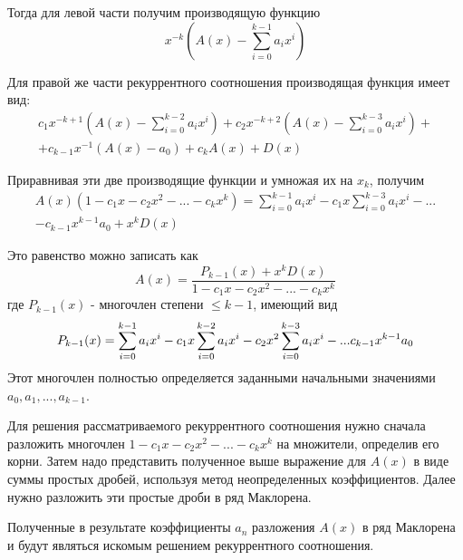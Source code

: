 Тогда для левой части получим производящую функцию 
\begin{equation*}
    x^{-k}\left(A(x) - \sum_{i = 0}^{k-1} a_i x^i\right)
\end{equation*}

Для правой же части рекуррентного соотношения производящая функция имеет вид:
\begin{multline*}
    c_1 x^{-k+1}\left(A(x) - \sum_{i = 0}^{k-2} a_i x^i\right) + c_2 x^{-k+2}\left(A(x) - \sum_{i = 0}^{k-3} a_i x^i \right) + \\
    + c_{k-1}x^{-1}(A(x) - a_0) + c_k A(x) + D(x)
\end{multline*}

Приравнивая эти две производящие функции и умножая их на $x_k$, получим
\begin{eqnarray*}
    A(x)(1 - c_1x - c_2 x^2 - ... - c_k x^k) = \sum_{i = 0}^{k-1} a_i x^i - c_1 x \sum_{i = 0}^{k-3} a_i x^i - ... \\
    - c_{k-1}x^{k-1}a_0 + x^k D(x)
\end{eqnarray*}

Это равенство можно записать как
\begin{equation}
    \label{gen_func_rec}
    A(x) = \frac{P_{k-1}(x) + x^k D(x)}{1 - c_1 x - c_2 x^2 - ... - c_k x^k}
\end{equation}
где $P_{k-1}(x)$ - многочлен степени $\leq k - 1$, имеющий вид 
\begin{equation}
    \label{p_k}
    P_{k-1}(x) = \sum_{i = 0}^{k - 1}a_i x^i - c_1 x \sum_{i = 0}^{k-2}a_i x^i - c_2 x^2\sum_{i = 0}^{k-3} a_i x^i - ... \\
    c_{k-1} x^{k-1}a_0 
\end{equation}
Этот многочлен полностью определяется заданными начальными значениями $a_0, a_1, ..., a_{k-1}$.

Для решения рассматриваемого рекуррентного соотношения нужно сначала разложить многочлен 
$1 - c_1x - c_2x^2 - ... - c_k x^k$ на множители, определив его корни. Затем надо представить полученное
выше выражение для $A(x)$ в виде суммы простых дробей, используя метод неопределенных коэффициентов. Далее нужно разложить
эти простые дроби в ряд Маклорена.

Полученные в результате коэффициенты $a_n$ разложения $A(x)$ в ряд Маклорена и будут являться
искомым решением рекуррентного соотношения.

